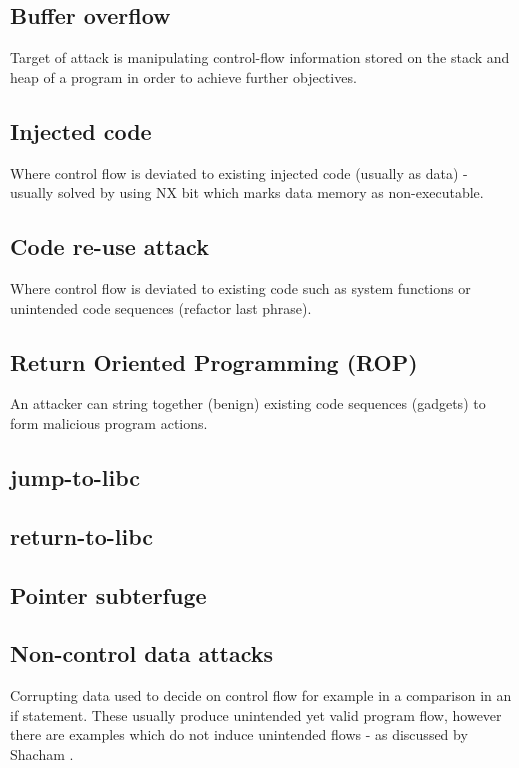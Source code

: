 \subsection{Buffer overflow}

Target of attack is manipulating control-flow information stored on the stack and heap of a program in order to achieve further objectives.

\subsection{Injected code}

Where control flow is deviated to existing injected code (usually as data) - usually solved by using NX bit which marks data memory as non-executable.

\subsection{Code re-use attack}
Where control flow is deviated to existing code such as system functions or unintended code sequences (refactor last phrase).

\subsection{Return Oriented Programming (ROP)}
An attacker can string together (benign) existing code sequences (gadgets) to form malicious program actions.

\subsection{jump-to-libc}
\subsection{return-to-libc}
\subsection{Pointer subterfuge}
\subsection{Non-control data attacks}
Corrupting data used to decide on control flow for example in a comparison in an if statement. These usually produce unintended yet valid program flow, however there are examples which do not induce unintended flows - as discussed by Shacham \cite{Shacham2007}.